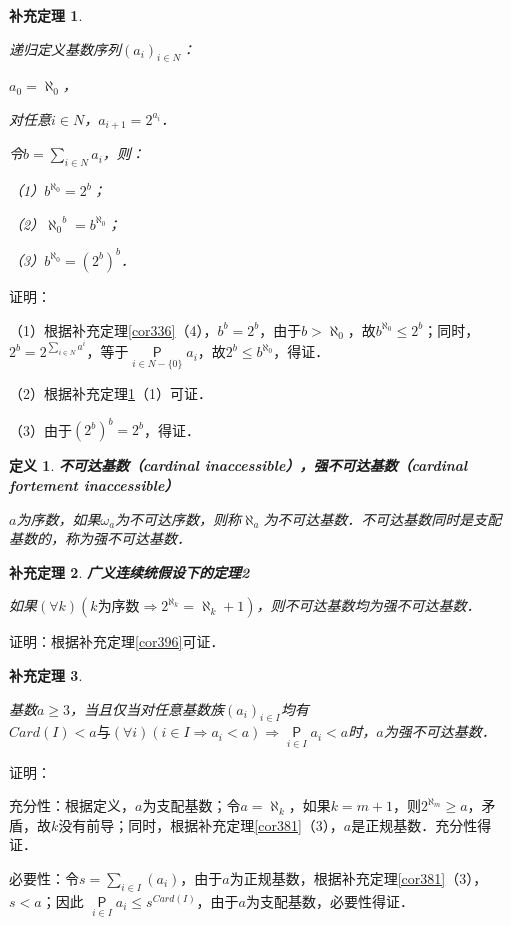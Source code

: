 \documentclass[12pt, a4paper, oneside]{book}
\newtheorem{cor}{补充定理}
\newtheorem{de}{定义}
\begin{document}
			\begin{cor}\label{cor398}
				\hfill\par
				递归定义基数序列$(a_i)_{i\in N}$：
				\par
				$a_0=\aleph_0$，
				\par
				对任意$i\in N$，$a_{i+1}=2^{a_i}$．
				\par
				令$b=\sum\limits_{i\in N}a_i$，则：
				\par
				（1）$b^{\aleph_0}=2^b$；
				\par
				（2）${\aleph_0}^b=b^{\aleph_0}$；
				\par
				（3）$b^{\aleph_0}=(2^b)^b$．
			\end{cor}
			证明：
			\par
			（1）根据补充定理\ref{cor336}（4），$b^b=2^b$，由于$b>\aleph_0$，故$b^{\aleph_0}\leq 2^b$；同时，$2^b=2^{\sum\limits_{i\in N}a^i}$，等于$\mathop{\mathsf{P}}\limits_{i\in N-\{0\}}a_i$，故$2^b\leq b^{\aleph_0}$，得证．
			\par
			（2）根据补充定理\ref{cor398}（1）可证．
			\par
			（3）由于$(2^b)^b=2^b$，得证．
			
			\begin{de}
				\textbf{不可达基数（cardinal inaccessible），强不可达基数（cardinal fortement inaccessible）}
				\par
				$a$为序数，如果$\omega_a$为不可达序数，则称$\aleph_a$为不可达基数．不可达基数同时是支配基数的，称为强不可达基数．
			\end{de}
			
			\begin{cor}\label{cor399}
				\textbf{广义连续统假设下的定理2}
				\par
				如果$(\forall k)(k\text{为序数}\Rightarrow 2^{\aleph_k}=\aleph_k+1)$，则不可达基数均为强不可达基数．
			\end{cor}
			证明：根据补充定理\ref{cor396}可证．
			
			\begin{cor}\label{cor400}
				\hfill\par
				基数$a\geq 3$，当且仅当对任意基数族$(a_i)_{i\in I}$均有$Card(I)<a\text{与}(\forall i)(i\in I\Rightarrow a_i<a)\Rightarrow \mathop{\mathsf{P}}\limits_{i\in I}a_i<a$时，$a$为强不可达基数．
			\end{cor}
			证明：
			\par
			充分性：根据定义，$a$为支配基数；令$a=\aleph_k$，如果$k=m+1$，则$2^{\aleph_m}\geq a$，矛盾，故$k$没有前导；同时，根据补充定理\ref{cor381}（3），$a$是正规基数．充分性得证．
			\par
			必要性：令$s=\sum\limits_{i\in I}(a_i)$，由于$a$为正规基数，根据补充定理\ref{cor381}（3），$s<a$；因此 $\mathop{\mathsf{P}}\limits_{i\in I}a_i\leq s^{Card(I)}$，由于$a$为支配基数，必要性得证．
			
\end{document}
